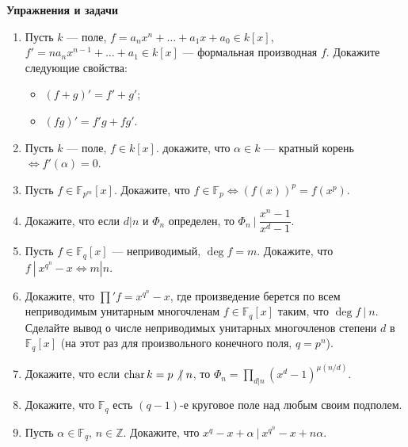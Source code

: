 \noindent\textbf{Упражнения и задачи}
\begin{enumerate}[topsep=0pt]
    \item Пусть $k$ --- поле, $f=a_nx^n+\dots+a_1x+a_0 \in k[x]$, $f'=n a_n x^{n-1}+\dots+a_1 \in k[x]$ --- формальная производная $f$. Докажите следующие свойства:
    \begin{itemize}[topsep=0pt]
        \item $(f+g)'=f'+g'$;
        \item $(fg)'=f'g+fg'$.
    \end{itemize}

    \item Пусть $k$ --- поле, $f \in k[x]$. докажите, что $\alpha \in k$ --- кратный корень $\Leftrightarrow f'(\alpha) = 0$.

    \item Пусть $f \in \mathbb{F}_{p^m}[x]$. Докажите, что $f\in \mathbb{F}_{p} \Leftrightarrow (f(x))^p=f(x^p)$.

    \item Докажите, что если $d|n$ и $\Phi_n$ определен, то $\Phi_n\ |\ \dfrac{x^n-1}{x^d-1}$.

    \item Пусть $f \in \mathbb{F}_q[x]$ --- неприводимый, $\deg f = m$. Докажите, что $f\ |\ x^{q^n}-x \Leftrightarrow m|n$.

    \item Докажите, что $\prod' f = x^{q^n}-x$, где произведение берется по всем неприводимым унитарным многочленам $f\in \mathbb{F}_q[x]$ таким, что $\deg f\ |\ n$. Сделайте вывод о числе неприводимых унитарных многочленов степени $d$ в $\mathbb{F}_q[x]$ (на этот раз для произвольного конечного поля, $q=p^n$).

    \item Докажите, что если $\chr k = p \not{|}\ n$, то $\Phi_n = \prod\limits_{d|n}(x^d-1)^{\mu(n/d)}$.
    
    \item Докажите, что $\mathbb{F}_q$ есть $(q-1)$-е круговое поле над любым своим подполем. %


    \item Пусть $\alpha \in \mathbb{F}_q$, $n \in \mathbb{Z}$. Докажите, что $x^q-x+\alpha\ |\ x^{q^n}-x+n\alpha$. %


\end{enumerate}

